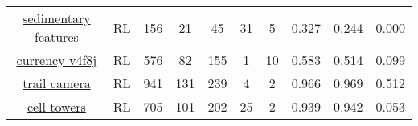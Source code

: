 \begin{longtable}{|| c | c | c c c | c c | c c c ||}
\cline{1-10}
\href{https://app.roboflow.com/roboflow-100/sedimentary-features-9eosf/4}{sedimentary features} & RL & 156 & 21 & 45 & 31 & 5 & 0.327 & 0.244 & 0.000 \\
\cline{1-10}
\href{https://app.roboflow.com/roboflow-100/currency-v4f8j/1}{currency v4f8j} & RL & 576 & 82 & 155 & 1 & 10 & 0.583 & 0.514 & 0.099 \\
\cline{1-10}
\href{https://app.roboflow.com/roboflow-100/trail-camera/1}{trail camera} & RL & 941 & 131 & 239 & 4 & 2 & 0.966 & 0.969 & 0.512 \\
\cline{1-10}
\href{https://app.roboflow.com/roboflow-100/cell-towers/1}{cell towers} & RL & 705 & 101 & 202 & 25 & 2 & 0.939 & 0.942 & 0.053 \\
\cline{1-10}
\end{longtable}